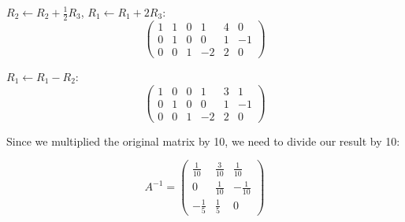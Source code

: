 $R_2 \leftarrow R_2 + \frac{1}{2}R_3$, $R_1 \leftarrow R_1 + 2R_3$:
\[
\left(\begin{array}{ccc|ccc}
1 & 1 & 0 & 1 & 4 & 0\\
0 & 1 & 0 & 0 & 1 & -1\\
0 & 0 & 1 & -2 & 2 & 0
\end{array}\right)
\]

$R_1 \leftarrow R_1 - R_2$:
\[
\left(\begin{array}{ccc|ccc}
1 & 0 & 0 & 1 & 3 & 1\\
0 & 1 & 0 & 0 & 1 & -1\\
0 & 0 & 1 & -2 & 2 & 0
\end{array}\right)
\]

Since we multiplied the original matrix by 10, we need to divide our result by 10:

\[
A^{-1} = \begin{pmatrix}
\frac{1}{10} & \frac{3}{10} & \frac{1}{10}\\
0 & \frac{1}{10} & -\frac{1}{10}\\
-\frac{1}{5} & \frac{1}{5} & 0
\end{pmatrix}
\]